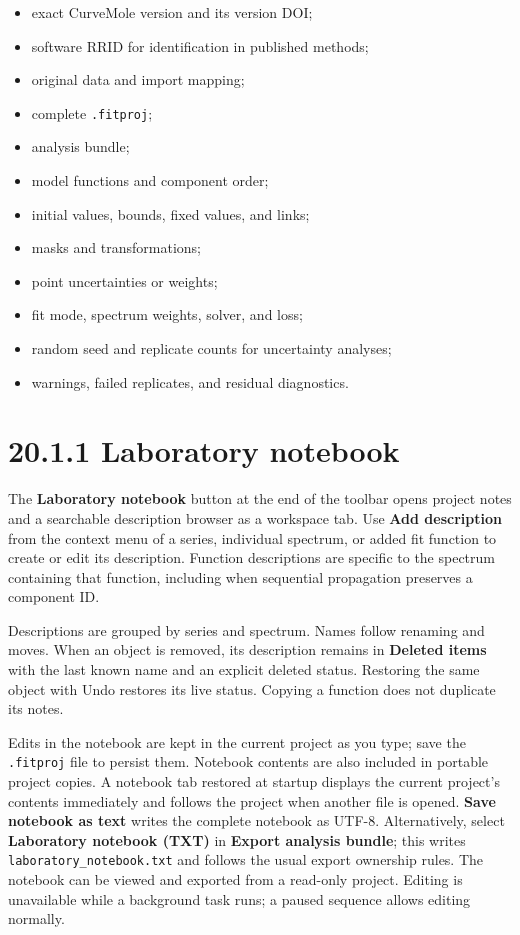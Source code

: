 \documentclass[
  10pt,
  a4paper,
  oneside]{scrreprt}
\providecommand{\tightlist}{%
  \setlength{\itemsep}{0pt}\setlength{\parskip}{0pt}}
\begin{document}
\begin{itemize}
\tightlist
\item
  exact CurveMole version and its version DOI;
\item
  software RRID for identification in published methods;
\item
  original data and import mapping;
\item
  complete \texttt{.fitproj};
\item
  analysis bundle;
\item
  model functions and component order;
\item
  initial values, bounds, fixed values, and links;
\item
  masks and transformations;
\item
  point uncertainties or weights;
\item
  fit mode, spectrum weights, solver, and loss;
\item
  random seed and replicate counts for uncertainty analyses;
\item
  warnings, failed replicates, and residual diagnostics.
\end{itemize}

\hypertarget{laboratory-notebook}{%
\section{20.1.1 Laboratory notebook}\label{laboratory-notebook}}

The \textbf{Laboratory notebook} button at the end of the toolbar opens
project notes and a searchable description browser as a workspace tab.
Use \textbf{Add description} from the context menu of a series,
individual spectrum, or added fit function to create or edit its
description. Function descriptions are specific to the spectrum
containing that function, including when sequential propagation
preserves a component ID.

Descriptions are grouped by series and spectrum. Names follow renaming
and moves. When an object is removed, its description remains in
\textbf{Deleted items} with the last known name and an explicit deleted
status. Restoring the same object with Undo restores its live status.
Copying a function does not duplicate its notes.

Edits in the notebook are kept in the current project as you type; save
the \texttt{.fitproj} file to persist them. Notebook contents are also
included in portable project copies. A notebook tab restored at startup
displays the current project's contents immediately and follows the
project when another file is opened. \textbf{Save notebook as text}
writes the complete notebook as UTF-8. Alternatively, select
\textbf{Laboratory notebook (TXT)} in \textbf{Export analysis bundle};
this writes \texttt{laboratory\_notebook.txt} and follows the usual
export ownership rules. The notebook can be viewed and exported from a
read-only project. Editing is unavailable while a background task runs;
a paused sequence allows editing normally.
\end{document}
